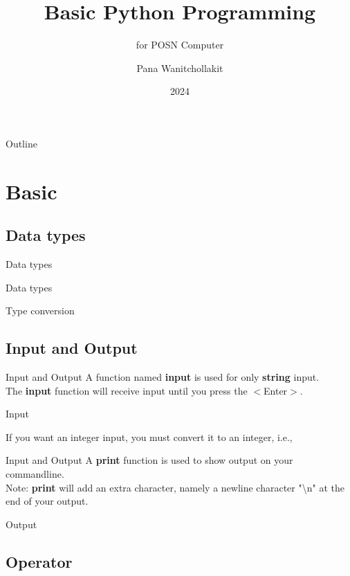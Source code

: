 \documentclass{beamer}
\title[Basic Python]{Basic Python Programming}
\subtitle[POSN Computer]{for POSN Computer}
\author[Pana W.]{Pana Wanitchollakit}
\date{2024}
\begin{document}
\frame{\titlepage}

\begin{frame}{Outline}
    \tableofcontents
\end{frame}


\section{Basic}

\subsection[Data types]{Data types}
\begin{frame}{Data types}
    \begin{block}{Data types}
        
    \end{block}
    \begin{block}{Type conversion}
        
    \end{block}
\end{frame}


\subsection[I/O]{Input and Output}
\begin{frame}{Input and Output}
    A function named \textbf{input} is used for only \textbf{string} input. \\
    The \textbf{input} function will receive input until you press the $<$Enter$>$.
    \begin{block}{Input}
        
        If you want an integer input, you must convert it to an integer, i.e.,
        
    \end{block}
\end{frame}

\begin{frame}{Input and Output}
    A \textbf{print} function is used to show output on your commandline. \\
    Note: \textbf{print} will add an extra character, namely a newline character "\textbackslash n" at the end of your output.
    \begin{block}{Output}
        
    \end{block}
\end{frame}

\subsection[Operator]{Operator}
\end{document}
